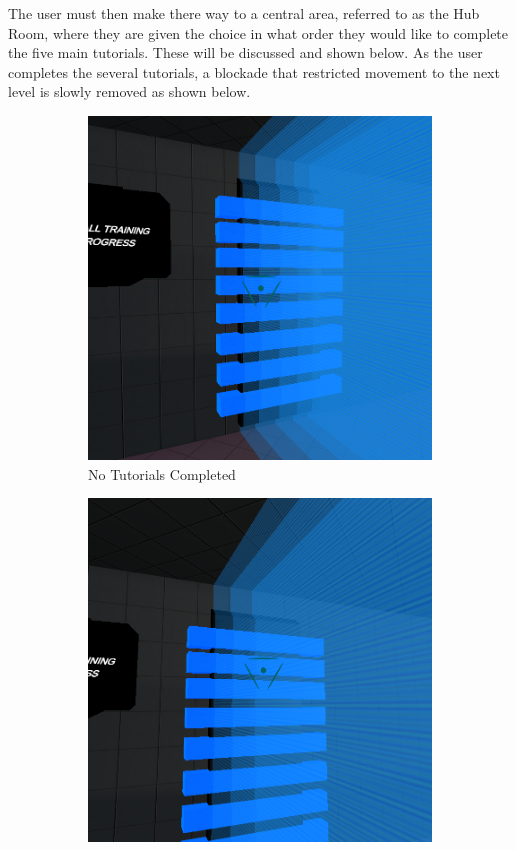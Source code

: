 \noindent The user must then make there way to a central area, referred to as the Hub Room, where they are given the choice in what order they would like to complete the five main tutorials. These will be discussed and shown below. As the user completes the several tutorials, a blockade that restricted movement to the next level is slowly removed as shown below.

\begin{figure}[H]
\centering
\begin{subfigure}{0.3\textwidth}
  \centering
  \includegraphics[width=1\linewidth]{Figures/barrier5.png}
  \caption{No Tutorials Completed}
\end{subfigure}%
\begin{subfigure}{0.3\textwidth}
  \centering
  \includegraphics[width=1\linewidth]{Figures/barrier3.png}

\end{subfigure}
\end{figure}
